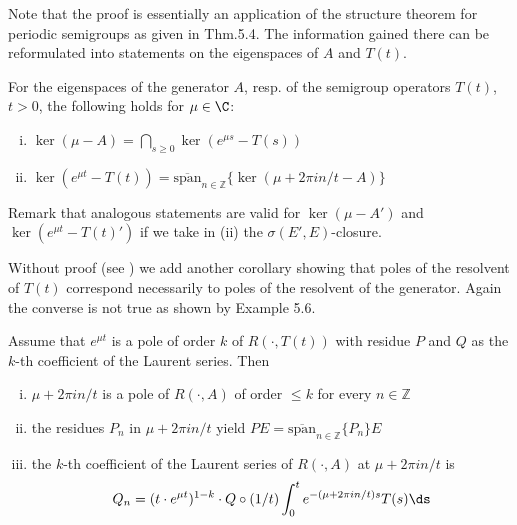 Note that the proof is essentially an application of the structure theorem for periodic semigroups as given in Thm.5.4.
The information gained there can be reformulated into statements on the eigenspaces of $A$ and $T(t)$.



\newpage
\begin{corollary}\label{cor:a3-6.4}
For the eigenspaces of the generator $A$, resp. of the semigroup operators $T(t)$, $t > 0$, the following holds  for  $\mu \in \C$:

\begin{enumerate}[(i)]
\item $\ker(\mu - A) = \bigcap_{s \geq 0} \ker(e^{\mu s} - T(s))$

\item $\ker(e^{\mu t} - T(t)) = \overline{\text{span}}_{n \in \mathbb{Z}} \{\ker(\mu + 2\pi i n/t - A)\}$
\end{enumerate}
\end{corollary}

Remark that analogous statements are valid for $\ker(\mu - A')$ and $\ker(e^{\mu t} - T(t)')$ if we take in (ii) the $\sigma(E',E)$-closure.

Without proof (see \citet[Prop.I.10]{greiner:1981}) we add another corollary showing that poles of the resolvent of $T(t)$ correspond necessarily to poles of the resolvent of the generator.
Again the converse is not true as shown by Example 5.6.

\begin{corollary}\label{cor:a3-6.5}
Assume that $e^{\mu t}$ is a pole of order $k$ of $R(\cdot,T(t))$ with residue $P$ and $Q$ as the $k$-th coefficient of the Laurent series.
Then

\begin{enumerate}[(i)]
\item $\mu + 2\pi i n/t$ is a pole of $R(\cdot,A)$ of order $\leq k$ for every $n \in \mathbb{Z}$

\item the residues $P_{n}$ in $\mu + 2\pi i n/t$ yield $PE = \overline{\text{span}}_{n \in \mathbb{Z}} \{P_{n}\}E$

\item the $k$-th coefficient of the Laurent series of $R(\cdot,A)$ at $\mu + 2\pi i n/t$ is
\[
Q_{n} = (t \cdot e^{\mu t})^{1-k} \cdot Q \circ (1/t) \int_{0}^{t} e^{-(\mu+2\pi i n/t)s}T(s) \ds
\]
\end{enumerate}
\end{corollary}

